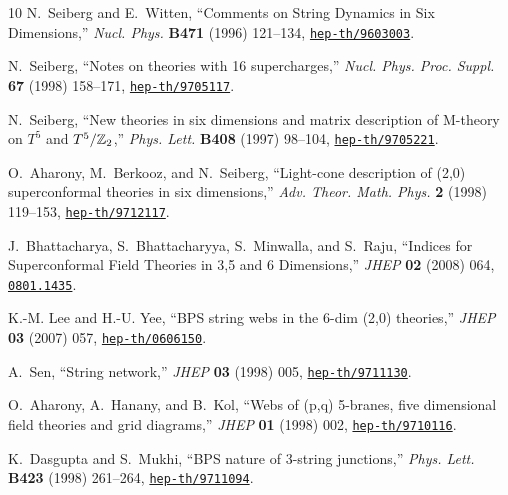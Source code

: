 \begin{thebibliography}{10}
N.~Seiberg and E.~Witten, ``{Comments on String Dynamics in Six Dimensions},''
  {\em Nucl. Phys.} {\bf B471} (1996) 121--134,
\href{http://www.arXiv.org/abs/hep-th/9603003}{{\tt hep-th/9603003}}.

N.~Seiberg, ``{Notes on theories with 16 supercharges},'' {\em Nucl. Phys.
  Proc. Suppl.} {\bf 67} (1998) 158--171,
\href{http://www.arXiv.org/abs/hep-th/9705117}{{\tt hep-th/9705117}}.

N.~Seiberg, ``{New theories in six dimensions and matrix description of
  M-theory on $T^5$ and $T^5 / \mathbb{Z}_2$},'' {\em Phys. Lett.} {\bf B408} (1997)
  98--104,
\href{http://www.arXiv.org/abs/hep-th/9705221}{{\tt hep-th/9705221}}.

O.~Aharony, M.~Berkooz, and N.~Seiberg, ``Light-cone description of (2,0)
  superconformal theories in six dimensions,'' {\em Adv. Theor. Math. Phys.}
  {\bf 2} (1998) 119--153,
\href{http://www.arXiv.org/abs/hep-th/9712117}{{\tt hep-th/9712117}}.

J.~Bhattacharya, S.~Bhattacharyya, S.~Minwalla, and S.~Raju, ``{Indices for
  Superconformal Field Theories in 3,5 and 6 Dimensions},'' {\em JHEP} {\bf 02}
  (2008) 064,
\href{http://www.arXiv.org/abs/0801.1435}{{\tt 0801.1435}}.

K.-M. Lee and H.-U. Yee, ``{BPS string webs in the 6-dim (2,0) theories},''
  {\em JHEP} {\bf 03} (2007) 057,
\href{http://www.arXiv.org/abs/hep-th/0606150}{{\tt hep-th/0606150}}.

A.~Sen, ``{String network},'' {\em JHEP} {\bf 03} (1998) 005,
\href{http://www.arXiv.org/abs/hep-th/9711130}{{\tt hep-th/9711130}}.

O.~Aharony, A.~Hanany, and B.~Kol, ``{Webs of (p,q) 5-branes, five dimensional
  field theories and grid diagrams},'' {\em JHEP} {\bf 01} (1998) 002,
\href{http://www.arXiv.org/abs/hep-th/9710116}{{\tt hep-th/9710116}}.

K.~Dasgupta and S.~Mukhi, ``{BPS nature of 3-string junctions},'' {\em Phys.
  Lett.} {\bf B423} (1998) 261--264,
\href{http://www.arXiv.org/abs/hep-th/9711094}{{\tt hep-th/9711094}}.


\end{thebibliography}
